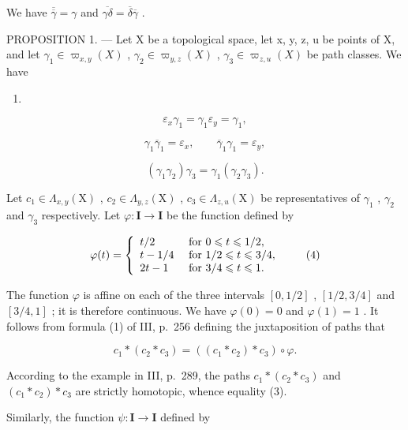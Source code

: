 We have \(\overline{\overline{\gamma}}=\gamma\) and \(\overline{\gamma\delta}=\overline{\delta}\overline{\gamma}\) .

PROPOSITION 1. --- Let X be a topological space, let x, y, z, u be points of X, and let \(\gamma_{1} \in \varpi_{x,y}(X)\) , \(\gamma_{2} \in \varpi_{y,z}(X)\) , \(\gamma_{3} \in \varpi_{z,u}(X)\) be path classes. We have

\begin{enumerate}
\def\labelenumi{(\arabic{enumi})}
\tightlist
\item
\end{enumerate}

\[
\varepsilon_ {x} \gamma_ {1} = \gamma_ {1} \varepsilon_ {y} = \gamma_ {1},\tag{2}
\]

\[
\gamma_ {1} \overline {{\gamma}} _ {1} = \varepsilon_ {x}, \qquad \overline {{\gamma}} _ {1} \gamma_ {1} = \varepsilon_ {y},\tag{3}
\]

\[
(\gamma_ {1} \gamma_ {2}) \gamma_ {3} = \gamma_ {1} (\gamma_ {2} \gamma_ {3}).
\]

Let \(c_{1} \in \Lambda_{x,y}(\mathrm{X})\) , \(c_{2} \in \Lambda_{y,z}(\mathrm{X})\) , \(c_{3} \in \Lambda_{z,u}(\mathrm{X})\) be representatives of \(\gamma_{1}\) , \(\gamma_{2}\) and \(\gamma_{3}\) respectively. Let \(\varphi: \mathbf{I} \to \mathbf{I}\) be the function defined by

\[
\varphi (t) = \left\{ \begin{array}{l l} t / 2 & \text { for } 0 \leqslant t \leqslant 1 / 2, \\ t - 1 / 4 & \text { for } 1 / 2 \leqslant t \leqslant 3 / 4, \\ 2 t - 1 & \text { for } 3 / 4 \leqslant t \leqslant 1. \end{array} \right.\tag{4}
\]

The function \(\varphi\) is affine on each of the three intervals \([0,1/2]\) , \([1/2,3/4]\) and \([3/4,1]\) ; it is therefore continuous. We have \(\varphi(0) = 0\) and \(\varphi(1) = 1\) . It follows from formula (1) of III, p.~256 defining the juxtaposition of paths that

\[
c _ {1} * (c _ {2} * c _ {3}) = ((c _ {1} * c _ {2}) * c _ {3}) \circ \varphi .
\]

According to the example in III, p.~289, the paths \(c_{1} * (c_{2} * c_{3})\) and \((c_{1} * c_{2}) * c_{3}\) are strictly homotopic, whence equality (3).

Similarly, the function \(\psi\colon\mathbf{I}\to\mathbf{I}\) defined by

